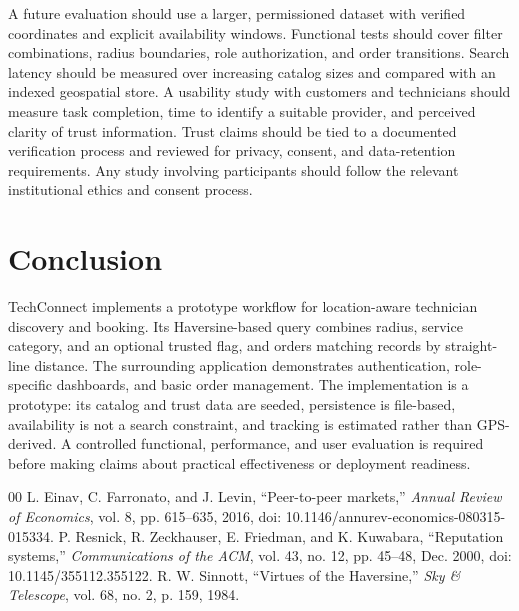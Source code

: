 \documentclass[conference]{IEEEtran}
\begin{document}
A future evaluation should use a larger, permissioned dataset with verified coordinates and explicit availability windows. Functional tests should cover filter combinations, radius boundaries, role authorization, and order transitions. Search latency should be measured over increasing catalog sizes and compared with an indexed geospatial store. A usability study with customers and technicians should measure task completion, time to identify a suitable provider, and perceived clarity of trust information. Trust claims should be tied to a documented verification process and reviewed for privacy, consent, and data-retention requirements. Any study involving participants should follow the relevant institutional ethics and consent process.

\section{Conclusion}
TechConnect implements a prototype workflow for location-aware technician discovery and booking. Its Haversine-based query combines radius, service category, and an optional trusted flag, and orders matching records by straight-line distance. The surrounding application demonstrates authentication, role-specific dashboards, and basic order management. The implementation is a prototype: its catalog and trust data are seeded, persistence is file-based, availability is not a search constraint, and tracking is estimated rather than GPS-derived. A controlled functional, performance, and user evaluation is required before making claims about practical effectiveness or deployment readiness.

\begin{thebibliography}{00}
 L. Einav, C. Farronato, and J. Levin, ``Peer-to-peer markets,'' \emph{Annual Review of Economics}, vol. 8, pp. 615--635, 2016, doi: 10.1146/annurev-economics-080315-015334.
 P. Resnick, R. Zeckhauser, E. Friedman, and K. Kuwabara, ``Reputation systems,'' \emph{Communications of the ACM}, vol. 43, no. 12, pp. 45--48, Dec. 2000, doi: 10.1145/355112.355122.
 R. W. Sinnott, ``Virtues of the Haversine,'' \emph{Sky \& Telescope}, vol. 68, no. 2, p. 159, 1984.
\end{thebibliography}
\end{document}
